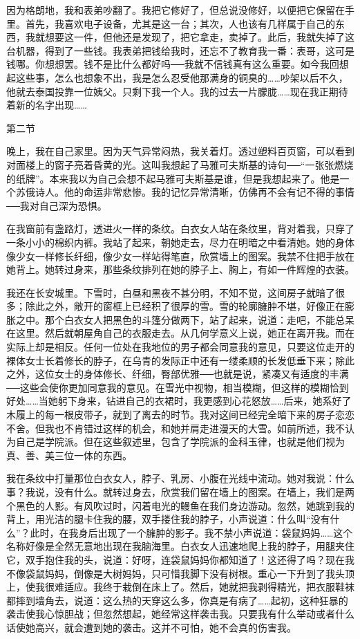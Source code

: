 因为格朗地，我和表弟吵翻了。我把它修好了，但总说没修好，以便把它保留在手里。首先，我喜欢电子设备，尤其是这一台；其次，人也该有几样属于自己的东西，我就想要这一件，但他还是发现了，把它拿走，卖掉了。此后，我就失掉了这台机器，得到了一些钱。我表弟把钱给我时，还忘不了教育我一番：表哥，这可是钱哪。你想想罢。钱不是比什么都好吗──我就不信钱真有这么重要。如今我回想起这些事，怎么也想象不出，我是怎么忍受他那满身的铜臭的……吵架以后不久，他就去泰国投靠一位姨父。只剩下我一个人。我的过去一片朦胧……现在我正期待着新的名字出现…… 

第二节 

晚上，我在自己家里。因为天气异常闷热，我关着灯。透过塑料百页窗，可以看到对面楼上的窗子亮着昏黄的光。这叫我想起了马雅可夫斯基的诗句──“一张张燃烧的纸牌”。本来我以为自己会想不起马雅可夫斯基是谁，但是我想起来了。他是一个苏俄诗人。他的命运非常悲惨。我的记忆异常清晰，仿佛再不会有记不得的事情──我对自己深为恐惧。 

在我窗前有盏路灯，透进火一样的条纹。白衣女人站在条纹里，背对着我，只穿了一条小小的棉织内裤。我站了起来，朝她走去，尽力在明暗之中看清她。她的身体像少女一样修长纤细，像少女一样站得笔直，欣赏墙上的图案。我禁不住把手放在她背上。她转过身来，那些条纹排列在她的脖子上、胸上，有如一件辉煌的衣装。 

我还在长安城里。下雪时，白昼和黑夜不甚分明，不知不觉，这间房子就暗了很多；除此之外，敞开的窗框上已经积了很厚的雪。雪的轮廓臃肿不堪，好像正在膨胀之中。那个白衣女人把黑色的斗篷分做两下，站了起来，说道：走吧，不能总呆在这里。然后就朝屋角自己的衣服走去。从几何学意义上说，她正在离开我。而在实际上却是相反。任何一位处在我地位的男子都会同意我的意见，只要这位走开的裸体女士长着修长的脖子，在乌青的发际正中还有一缕柔顺的长发低垂下来；除此之外，这位女士的身体修长、纤细，臀部优雅──也就是说，紧凑又有适度的丰满──这些会使你更加同意我的意见。在雪光中视物，相当模糊，但这样的模糊恰到好处……当她躬下身来，钻进自己的衣裙时，我更感到心花怒放……后来，她系好了木履上的每一根皮带子，就到了离去的时节。我对这间已经完全暗下来的房子恋恋不舍。但我也不肯错过这样的机会，和她并肩走进漫天的大雪。如前所述，我不认为自己是学院派。但在这些叙述里，包含了学院派的金科玉律，也就是他们视为真、善、美三位一体的东西。 

我在条纹中打量那位白衣女人，脖子、乳房、小腹在光线中流动。她对我说：什么事？我说，没有什么。就转过身去，欣赏我们留在墙上的图案。在墙上，我们是两个黑色的人影。有风吹过时，闪着电光的鳗鱼在我们身边游动。忽然，她跳到我的背上，用光洁的腿卡住我的腰，双手搂住我的脖子，小声说道：什么叫“没有什么”？此时，在我身后出现了一个臃肿的影子。我不禁小声说道：袋鼠妈妈……这个名称好像是全然无意地出现在我脑海里。白衣女人迅速地爬上我的脖子，用腿夹住它，双手抱住我的头，说道：好呀，连袋鼠妈妈你都知道了！这还得了吗？现在我不像袋鼠妈妈，倒像是大树妈妈，只可惜我脚下没有树根。重心一下升到了我头顶上，使我很难适应。我终于栽倒在床上了。然后，她就把我剥得精光，把衣服鞋袜都摔到墙角去，说道：这么热的天穿这么多，你真是有病了……起初，这种狂暴的袭击使我心惊胆战；但忽然想起，她经常这样袭击我。只要我有什么举动或者什么话使她高兴，就会遭到她的袭击。这并不可怕，她不会真的伤害我。 


